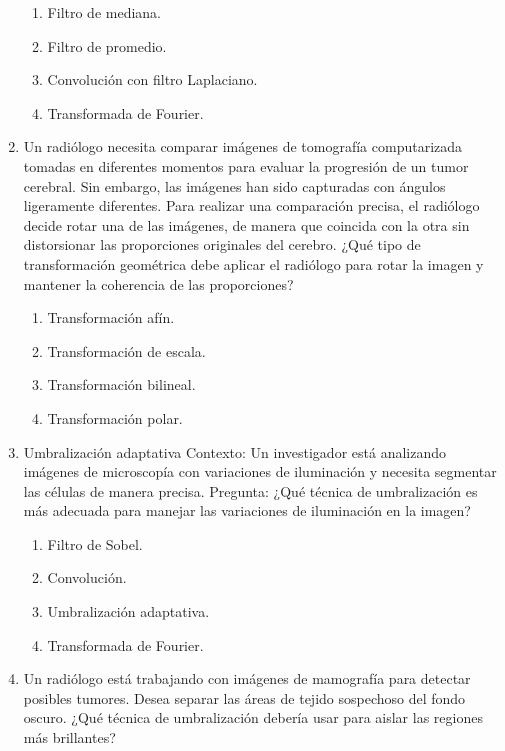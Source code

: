 \documentclass[12pt,a4paper]{article}
\providecommand{\tightlist}{%
  \setlength{\itemsep}{0pt}\setlength{\parskip}{0pt}}\usepackage{longtable,booktabs,array}
\providecommand{\tightlist}{%
  \setlength{\itemsep}{0pt}\setlength{\parskip}{2pt}}
\begin{document}
\begin{enumerate}
  \begin{enumerate}
  \tightlist
  \item
    Filtro de mediana.
  \item
    Filtro de promedio.
  \item
    Convolución con filtro Laplaciano.
  \item
    Transformada de Fourier.
  \end{enumerate}
\item
  Un radiólogo necesita comparar imágenes de tomografía computarizada
  tomadas en diferentes momentos para evaluar la progresión de un tumor
  cerebral. Sin embargo, las imágenes han sido capturadas con ángulos
  ligeramente diferentes. Para realizar una comparación precisa, el
  radiólogo decide rotar una de las imágenes, de manera que coincida con
  la otra sin distorsionar las proporciones originales del cerebro. ¿Qué
  tipo de transformación geométrica debe aplicar el radiólogo para rotar
  la imagen y mantener la coherencia de las proporciones?

  \begin{enumerate}
  \tightlist
  \item
    Transformación afín.
  \item
    Transformación de escala.
  \item
    Transformación bilineal.
  \item
    Transformación polar.
  \end{enumerate}
\item
  Umbralización adaptativa Contexto: Un investigador está analizando
  imágenes de microscopía con variaciones de iluminación y necesita
  segmentar las células de manera precisa. Pregunta: ¿Qué técnica de
  umbralización es más adecuada para manejar las variaciones de
  iluminación en la imagen?

  \begin{enumerate}
  \tightlist
  \item
    Filtro de Sobel.
  \item
    Convolución.
  \item
    Umbralización adaptativa.
  \item
    Transformada de Fourier.
  \end{enumerate}
\item
  Un radiólogo está trabajando con imágenes de mamografía para detectar
  posibles tumores. Desea separar las áreas de tejido sospechoso del
  fondo oscuro. ¿Qué técnica de umbralización debería usar para aislar
  las regiones más brillantes?


\end{enumerate}
\end{document}
